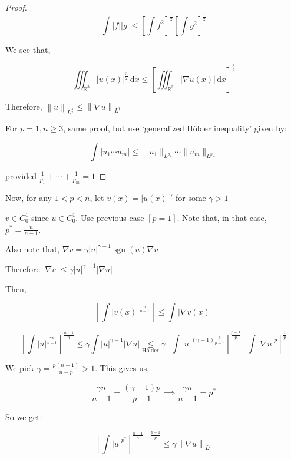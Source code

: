 \documentclass{article}
\theoremstyle{definition}
\newcommand{\sgn}{\operatorname{sgn}}
\begin{document}
\begin{proof}
    \[
        \int \vert f \vert \vert g \vert \leq \left[ \int f^2 \right] ^{\frac{1}{2}} \left[ \int g^2 \right] ^{\frac{1}{2}  }
    \]

    We see that,

    \[
        \iiint _{\mathbb{R} ^3} \vert u(x) \vert ^\frac{3}{2} \, \mathrm{d} x \leq \left[ \iiint _{\mathbb{R} ^3} \vert \nabla u(x) \vert \,\mathrm{d} x \right] ^{\frac{3}{2}}
    \]

    Therefore, \(\left\lVert u \right\rVert _{L^{\frac{3}{2}}} \leq \left\lVert \nabla u \right\rVert _{L^1}\) 

    For \(p = 1, n \geq 3\), same proof, but use `generalized H\"older inequality' given by:

    \[
        \int \vert u_1 \cdots u_m \vert \leq \lVert u_1 \rVert _{L^{p_1}} \cdots \lVert u_m \rVert _{L^{p_m}}
    \]

    provided \(\frac{1}{p_1} + \cdots + \frac{1}{p_m} = 1\) 

\end{proof}

Now, for any \(1 < p < n\), let \(v(x) = \vert u(x) \vert ^ \gamma \) for some \(\gamma > 1\) 

\(v\in C_0^1\) since \(u\in C^1_0\). Use previous case \([p=1]\). Note that, in that case, \(p^{\ast} = \frac{n}{n-1}\).

Also note that, \(\nabla v = \gamma \vert u \vert ^{\gamma -1} \sgn (u)\nabla u\) 

Therefore \(\vert \nabla v \vert \leq \gamma \vert u \vert ^{\gamma -1} \vert \nabla u \vert \) 

Then,

\[
    \left[ \int \vert v(x) \vert ^{\frac{n}{n-1}} \right] \leq \int \vert \nabla v(x) \vert 
\]

\[
    \left[ \int \vert u \vert ^{\frac{\gamma n}{n-1}} \right] ^{\frac{n-1}{n}} \leq \gamma \int \vert u \vert ^ {\gamma -1} \vert \nabla u \vert \underset{\text{H\"older}}{\leq} \gamma \left[ \int \vert u \vert ^{(\gamma -1) \frac{p}{p-1}} \right]^{\frac{p-1}{p}} \left[ \int \vert \nabla u \vert ^ p \right] ^{\frac{1}{p}} 
\]

We pick \(\gamma = \frac{p(n-1)}{n-p} > 1\). This gives us,

\[
    \frac{\gamma n}{n-1} = \frac{(\gamma -1)p}{p-1} \implies \frac{\gamma n}{n-1} = p^{\ast} 
\]

So we get:

\[
    \left[ \int \vert u \vert ^{p^{\ast}} \right] ^ { \frac{n-1}{n} - \frac{p-1}{p} } \leq \gamma  \left\lVert \nabla u \right\rVert _{L^p}
\]
\end{document}
